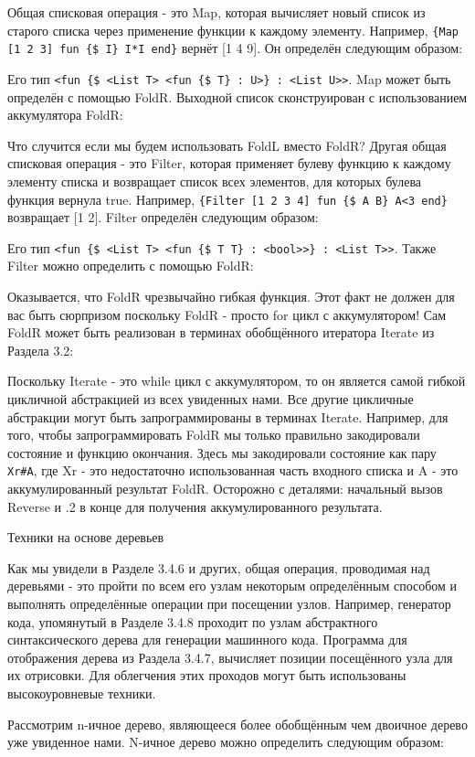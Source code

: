 Общая списковая операция - это Map, которая вычисляет новый список из старого списка через применение функции к каждому элементу. Например, \verb!{Map [1 2 3] fun {$ I} I*I end}! вернёт [1 4 9]. Он определён следующим образом:

Его тип \verb!<fun {$ <List T> <fun {$ T} : U>} : <List U>>!. Map может быть определён с помощью FoldR. Выходной список сконструирован с использованием аккумулятора FoldR:

Что случится если мы будем использовать FoldL вместо FoldR? Другая общая списковая операция - это Filter, которая применяет булеву функцию к каждому элементу списка и возвращает список всех элементов, для которых булева функция вернула true. Например, \verb!{Filter [1 2 3 4] fun {$ A B} A<3 end}! возвращает [1 2]. Filter определён следующим образом:

Его тип \verb!<fun {$ <List T> <fun {$ T T} : <bool>>} : <List T>>!. Также Filter можно определить с помощью FoldR:

Оказывается, что FoldR чрезвычайно гибкая функция. Этот факт не должен для вас быть сюрпризом поскольку FoldR - просто for цикл с аккумулятором! Сам FoldR может быть реализован в терминах обобщённого итератора Iterate из Раздела 3.2:

Поскольку Iterate - это while цикл с аккумулятором, то он является самой гибкой цикличной абстракцией из всех увиденных нами. Все другие цикличные абстракции могут быть запрограммированы в терминах Iterate. Например, для того, чтобы запрограммировать FoldR мы только правильно закодировали состояние и функцию окончания. Здесь мы закодировали состояние как пару \verb!Xr#A!, где Xr - это недостаточно использованная часть входного списка и A - это аккумулированный результат FoldR. Осторожно с деталями: начальный вызов Reverse и .2 в конце для получения аккумулированного результата.

Техники на основе деревьев

Как мы увидели в Разделе 3.4.6 и других, общая операция, проводимая над деревьями - это пройти по всем его узлам некоторым определённым способом и выполнять определённые операции при посещении узлов. Например, генератор кода, упомянутый в Разделе 3.4.8 проходит по узлам абстрактного синтаксического дерева для генерации машинного кода. Программа для отображения дерева из Раздела 3.4.7, вычисляет позиции посещённого узла для их отрисовки. Для облегчения этих проходов могут быть использованы высокоуровневые техники.

Рассмотрим n-ичное дерево, являющееся более обобщённым чем двоичное дерево уже увиденное нами. N-ичное дерево можно определить следующим образом:

